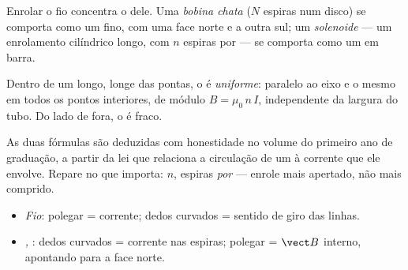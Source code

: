 \begin{definition}\label{def:g11:magnetic-fields:solenoid}
Enrolar o fio concentra o  dele. Uma \emph{bobina
chata} ($N$ espiras num disco) se comporta como um 
fino, com uma face norte e a outra sul; um
\emph{solenoide} --- um enrolamento cilíndrico longo,
com $n$ espiras por  --- se comporta como um  em barra.
\end{definition}

\begin{proposition}\label{prop:g11:magnetic-fields:solenoidfield}
Dentro de um  longo, longe das pontas, o  é
\emph{uniforme}: paralelo ao eixo e o mesmo em todos os pontos
interiores, de módulo $B = \mu_0\, n\, I$, independente da largura do
tubo. Do lado de fora, o  é fraco.
\end{proposition}
\admitted

\begin{remark}
As duas fórmulas são deduzidas com honestidade no volume do primeiro ano
de graduação, a partir da lei que relaciona a circulação de um  à
corrente que ele envolve. Repare no que importa: $n$, espiras \emph{por
} --- enrole mais apertado, não mais comprido.
\end{remark}

\begin{method}\label{met:g11:magnetic-fields:righthand}
\begin{itemize}
  \item \emph{Fio}: polegar = corrente; dedos curvados = sentido de giro
        das linhas.
  \item \emph{, }: dedos curvados = corrente nas espiras;
        polegar = $\vect B$ interno, apontando para a face norte.
\end{itemize}
\end{method}

